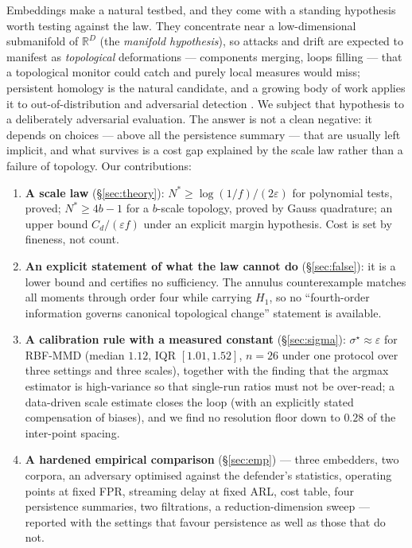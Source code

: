 \documentclass[11pt]{article}
\theoremstyle{remark}
\begin{document}
Embeddings make a natural testbed, and they come with a standing hypothesis worth testing against
the law. They concentrate near a low-dimensional submanifold of $\mathbb{R}^D$ (the \emph{manifold
hypothesis}), so attacks and drift are expected to manifest as \emph{topological} deformations ---
components merging, loops filling --- that a topological monitor could catch and purely local
measures would miss; persistent homology is the natural candidate, and a growing body of work
applies it to out-of-distribution and adversarial detection
\citep{carlsson2009topology,naitzat2020topology}. We subject that hypothesis to a deliberately
adversarial evaluation. The answer is not a clean negative: it depends on choices --- above all the
persistence summary --- that are usually left implicit, and what survives is a cost gap explained by
the scale law rather than a failure of topology.
Our contributions:
\begin{enumerate}
\item \textbf{A scale law} (\S\ref{sec:theory}): $N^*\ge\log(1/f)/(2\varepsilon)$ for polynomial
tests, proved; $N^*\ge4b-1$ for a $b$-scale topology, proved by Gauss quadrature; an upper bound
$C_d/(\varepsilon f)$ under an explicit margin hypothesis. Cost is set by fineness, not count.
\item \textbf{An explicit statement of what the law cannot do} (\S\ref{sec:false}): it is a lower
bound and certifies no sufficiency. The annulus counterexample matches all moments through order
four while carrying $H_1$, so no ``fourth-order information governs canonical topological change''
statement is available.
\item \textbf{A calibration rule with a measured constant} (\S\ref{sec:sigma}):
$\sigma^\star\approx\varepsilon$ for RBF-MMD (median $1.12$, IQR $[1.01,1.52]$, $n=26$ under one
protocol over three settings and three scales), together with the finding that the argmax estimator
is high-variance so that single-run ratios must not be over-read; a data-driven scale estimate
closes the loop (with an explicitly stated compensation of biases), and we find no resolution floor
down to $0.28$ of the inter-point spacing.
\item \textbf{A hardened empirical comparison} (\S\ref{sec:emp}) --- three embedders, two corpora,
an adversary optimised against the defender's statistics, operating points at fixed FPR, streaming
delay at fixed ARL, cost table, four persistence summaries, two filtrations, a reduction-dimension
sweep --- reported with the settings that favour persistence as well as those that do not.
\end{enumerate}
\end{document}
